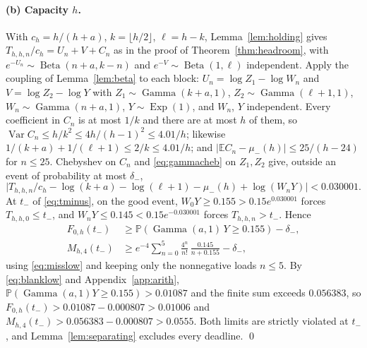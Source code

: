 \documentclass[11pt,a4paper]{article}
\theoremstyle{plain}
\theoremstyle{definition}
\theoremstyle{remark}
\newcommand{\Prob}{\mathbb P}
\newcommand{\E}{\mathbb E}
\newcommand{\Var}{\operatorname{Var}}
\DeclareMathOperator{\Gam}{Gamma}
\DeclareMathOperator{\Bet}{Beta}
\DeclareMathOperator{\Ex}{Exp}
\begin{document}
\paragraph{(b) Capacity $h$.} With $c_h=h/(h+a)$, $k=\lfloor h/2\rfloor$, $\ell=h-k$, Lemma~\ref{lem:holding} gives $T_{h,h,n}/c_h=U_n+V+C_n$ as in the proof of Theorem~\ref{thm:headroom}, with $e^{-U_n}\sim\Bet(n+a,k-n)$ and $e^{-V}\sim\Bet(1,\ell)$ independent. Apply the coupling of Lemma~\ref{lem:beta} to each block: $U_n=\log Z_1-\log W_n$ and $V=\log Z_2-\log Y$ with $Z_1\sim\Gam(k+a,1)$, $Z_2\sim\Gam(\ell+1,1)$, $W_n\sim\Gam(n+a,1)$, $Y\sim\Ex(1)$, and $W_n$, $Y$ independent. Every coefficient in $C_n$ is at most $1/k$ and there are at most $h$ of them, so $\Var C_n\le h/k^2\le4h/(h-1)^2\le4.01/h$; likewise $1/(k+a)+1/(\ell+1)\le2/k\le4.01/h$; and $|\E C_n-\mu_-(h)|\le25/(h-24)$ for $n\le25$. Chebyshev on $C_n$ and \eqref{eq:gammacheb} on $Z_1,Z_2$ give, outside an event of probability at most $\delta_-$,
\begin{equation}\label{eq:goodminus}
\bigl|T_{h,h,n}/c_h-\log(k+a)-\log(\ell+1)-\mu_-(h)+\log(W_nY)\bigr|<0.030001.
\end{equation}
At $t_-$ of \eqref{eq:tminus}, on the good event, $W_0Y\ge0.155>0.15e^{0.030001}$ forces $T_{h,h,0}\le t_-$, and $W_nY\le0.145<0.15e^{-0.030001}$ forces $T_{h,h,n}>t_-$. Hence
\begin{align*}
F_{0,h}(t_-)&\ge\Prob(\Gam(a,1)\,Y\ge0.155)-\delta_-,\\
M_{h,4}(t_-)&\ge e^{-4}\sum_{n=0}^{5}\frac{4^n}{n!}\,\frac{0.145}{n+0.155}-\delta_-,
\end{align*}
using \eqref{eq:misslow} and keeping only the nonnegative loads $n\le5$. By \eqref{eq:blanklow} and Appendix~\ref{app:arith}, $\Prob(\Gam(a,1)Y\ge0.155)>0.01087$ and the finite sum exceeds $0.056383$, so $F_{0,h}(t_-)>0.01087-0.000807>0.01006$ and $M_{h,4}(t_-)>0.056383-0.000807>0.0555$. Both limits are strictly violated at $t_-$, and Lemma~\ref{lem:separating} excludes every deadline. \qed
\end{document}
